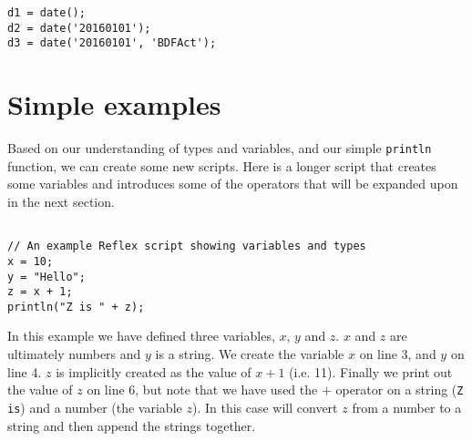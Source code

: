 \begin{lstlisting}[caption={Date examples}]
d1 = date();
d2 = date('20160101');
d3 = date('20160101', 'BDFAct');
\end{lstlisting}


\section{Simple examples}
Based on our understanding of types and variables, and our simple \Verb+println+ function, we can create some new \Reflex scripts. Here is a longer script that creates some variables and introduces some of the operators that will be expanded upon in the next section.

\begin{lstlisting}[caption={Variables and Types}]

// An example Reflex script showing variables and types
x = 10;
y = "Hello";
z = x + 1;
println("Z is " + z);
\end{lstlisting}

In this example we have defined three variables, $x$, $y$ and $z$. $x$ and $z$ are ultimately numbers and $y$ is a string. We create the variable $x$ on line 3, and $y$ on line 4. $z$ is implicitly created as the value of $x+1$ (i.e. 11). Finally we print out the value of $z$ on line 6, but note that we have used the $+$ operator on a string (\Verb+Z is+) and a number (the variable $z$). In this case \Reflex will convert $z$ from a number to a string and then append the strings together.

